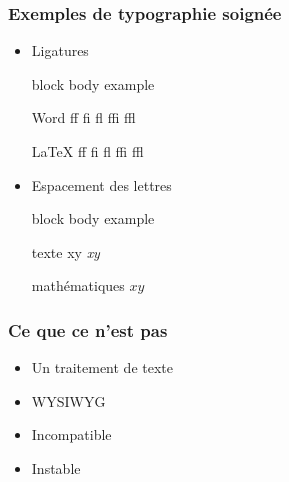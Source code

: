 \documentclass[aspectratio=54,xcolor=x11names]{beamer}
\renewenvironment{quote}{%
    \begin{beamercolorbox}[wd=\linewidth,sep=6pt]{block body example}}
    {\end{beamercolorbox}}
\theoremstyle{definition}
\begin{document}
\begin{frame}
  \frametitle{Exemples de typographie soignée}
  \begin{itemize}
  \item Ligatures
    \begin{quote}
      \begin{minipage}{0.45\linewidth}
        \vspace{-12pt}
        \begin{block}{\small Word}
          \rmfamily f\/f \quad f\/i \quad f\/l \quad f\/f\/i \quad
          f\/f\/l
        \end{block}
      \end{minipage}
      \hfill
      \begin{minipage}{0.4\linewidth}
        \vspace{-12pt}
        \begin{block}{\small \LaTeX}
          \rmfamily ff \quad fi \quad fl \quad ffi \quad ffl
        \end{block}
      \end{minipage}
    \end{quote}
  \item Espacement des lettres
    \begin{quote}
      \begin{minipage}{0.45\linewidth}
        \vspace{-12pt}
        \begin{block}{\small texte}
          \rmfamily xy \quad \emph{xy}
        \end{block}
      \end{minipage}
      \hfill
      \begin{minipage}{0.4\linewidth}
        \vspace{-12pt}
        \begin{block}{\small mathématiques}
          $xy$
        \end{block}
      \end{minipage}
    \end{quote}
  \end{itemize}
\end{frame}

\begin{frame}
  \frametitle{Ce que ce n'est pas}
  \begin{itemize}
  \item Un traitement de texte
  \item WYSIWYG
  \item Incompatible
  \item Instable
  \end{itemize}
\end{frame}
\end{document}
